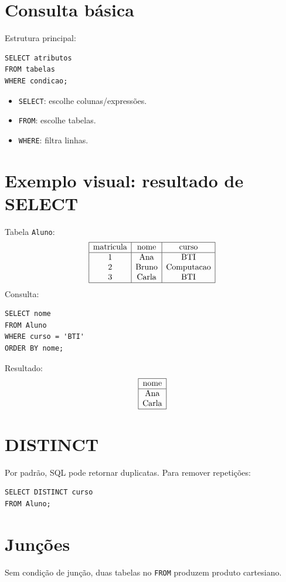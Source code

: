 \documentclass[12pt,a4paper]{article}
\begin{document}
\section{Consulta básica}
Estrutura principal:
\begin{verbatim}
SELECT atributos
FROM tabelas
WHERE condicao;
\end{verbatim}

\begin{itemize}
    \item \texttt{SELECT}: escolhe colunas/expressões.
    \item \texttt{FROM}: escolhe tabelas.
    \item \texttt{WHERE}: filtra linhas.
\end{itemize}

\section{Exemplo visual: resultado de SELECT}
Tabela \texttt{Aluno}:
\[
\begin{array}{|c|c|c|}
\hline
\text{matricula} & \text{nome} & \text{curso}\\
\hline
1 & \text{Ana} & \text{BTI}\\
2 & \text{Bruno} & \text{Computacao}\\
3 & \text{Carla} & \text{BTI}\\
\hline
\end{array}
\]
Consulta:
\begin{verbatim}
SELECT nome
FROM Aluno
WHERE curso = 'BTI'
ORDER BY nome;
\end{verbatim}
Resultado:
\[
\begin{array}{|c|}
\hline
\text{nome}\\
\hline
\text{Ana}\\
\text{Carla}\\
\hline
\end{array}
\]

\section{DISTINCT}
Por padrão, SQL pode retornar duplicatas. Para remover repetições:
\begin{verbatim}
SELECT DISTINCT curso
FROM Aluno;
\end{verbatim}

\section{Junções}
Sem condição de junção, duas tabelas no \texttt{FROM} produzem produto cartesiano.
\end{document}
